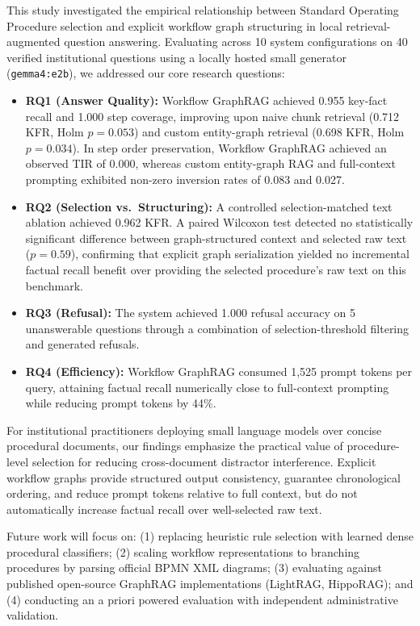\documentclass[preprint,10pt]{elsarticle}
\begin{document}
This study investigated the empirical relationship between Standard Operating Procedure selection and explicit workflow graph structuring in local retrieval-augmented question answering. Evaluating across 10 system configurations on 40 verified institutional questions using a locally hosted small generator (\texttt{gemma4:e2b}), we addressed our core research questions:
\begin{itemize}[leftmargin=*]
\item \textbf{RQ1 (Answer Quality):} Workflow GraphRAG achieved 0.955 key-fact recall and 1.000 step coverage, improving upon naive chunk retrieval (0.712 KFR, Holm $p=0.053$) and custom entity-graph retrieval (0.698 KFR, Holm $p=0.034$). In step order preservation, Workflow GraphRAG achieved an observed TIR of 0.000, whereas custom entity-graph RAG and full-context prompting exhibited non-zero inversion rates of 0.083 and 0.027.
\item \textbf{RQ2 (Selection vs.\ Structuring):} A controlled selection-matched text ablation achieved 0.962 KFR. A paired Wilcoxon test detected no statistically significant difference between graph-structured context and selected raw text ($p=0.59$), confirming that explicit graph serialization yielded no incremental factual recall benefit over providing the selected procedure's raw text on this benchmark.
\item \textbf{RQ3 (Refusal):} The system achieved 1.000 refusal accuracy on 5 unanswerable questions through a combination of selection-threshold filtering and generated refusals.
\item \textbf{RQ4 (Efficiency):} Workflow GraphRAG consumed 1,525 prompt tokens per query, attaining factual recall numerically close to full-context prompting while reducing prompt tokens by 44\%.
\end{itemize}

For institutional practitioners deploying small language models over concise procedural documents, our findings emphasize the practical value of procedure-level selection for reducing cross-document distractor interference. Explicit workflow graphs provide structured output consistency, guarantee chronological ordering, and reduce prompt tokens relative to full context, but do not automatically increase factual recall over well-selected raw text.

Future work will focus on: (1) replacing heuristic rule selection with learned dense procedural classifiers; (2) scaling workflow representations to branching procedures by parsing official BPMN XML diagrams; (3) evaluating against published open-source GraphRAG implementations (LightRAG, HippoRAG); and (4) conducting an a priori powered evaluation with independent administrative validation.
\end{document}
